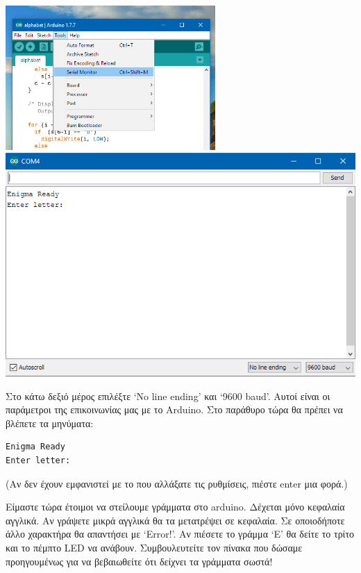 \documentclass[a4paper,twoside,12pt]{article}
\begin{document}
\begin{center}
  \includegraphics[width=0.6\textwidth]{images/main/serial-monitor}
  \includegraphics[width=1.0\textwidth]{images/main/serial-monitor2}
\end{center}

Στο κάτω δεξιό μέρος επιλέξτε `No line ending' και `9600 baud'. Αυτοί είναι οι παράμετροι της επικοινωνίας μας με το Arduino. Στο παράθυρο τώρα θα πρέπει να βλέπετε τα μηνύματα:

\begin{verbatim}
Enigma Ready
Enter letter: 
\end{verbatim}

(Αν δεν έχουν εμφανιστεί με το που αλλάξατε τις ρυθμίσεις, πιέστε enter μια φορά.)

Είμαστε τώρα έτοιμοι να στείλουμε γράμματα στο arduino. Δέχεται μόνο κεφαλαία αγγλικά. Αν γράψετε μικρά αγγλικά θα τα μετατρέψει σε κεφαλαία. Σε οποιοδήποτε άλλο χαρακτήρα θα απαντήσει με `Error!'. Αν πιέσετε το γράμμα `Ε' θα δείτε το τρίτο και το πέμπτο LED να ανάβουν. Συμβουλευτείτε τον πίνακα που δώσαμε προηγουμένως για να βεβαιωθείτε ότι δείχνει τα γράμματα σωστά!
\end{document}
